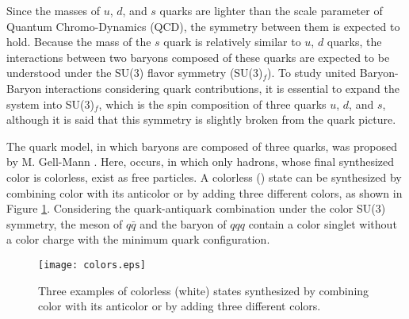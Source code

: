 Since the masses of $u$, $d$, and $s$ quarks are lighter than the scale parameter of Quantum Chromo-Dynamics (QCD), the symmetry between them is expected to hold. Because the mass of the $s$ quark is relatively similar to $u$, $d$ quarks, the interactions between two baryons composed of these quarks are expected to be understood under the SU(3) flavor symmetry (SU(3)$_f$). To study united Baryon-Baryon interactions considering quark contributions, it is essential to expand the system into SU(3)$_f$, which is the spin composition of three quarks $u$, $d$, and $s$, although it is said that this symmetry is slightly broken from the quark picture.

The quark model, in which baryons are composed of three quarks, was proposed by M. Gell-Mann \cite{mgm-1956} \cite{mgm-1961}. %
Here,  occurs, in which only hadrons, whose final synthesized color is colorless, exist as free particles. A colorless () state can be synthesized by combining color with its anticolor or by adding three different colors, as shown in Figure \ref{fig-colors}. Considering the quark-antiquark combination under the color SU(3) symmetry, the meson of $q\bar{q}$ and the baryon of $qqq$ contain a color singlet without a color charge with the minimum quark configuration.
\begin{figure}[h!]
  \begin{center}
  \texttt{[image: colors.eps]}
  \caption{Three examples of colorless (white) states synthesized by combining color with its anticolor or by adding three different colors.}
  \label{fig-colors}
  \end{center}
\end{figure}

